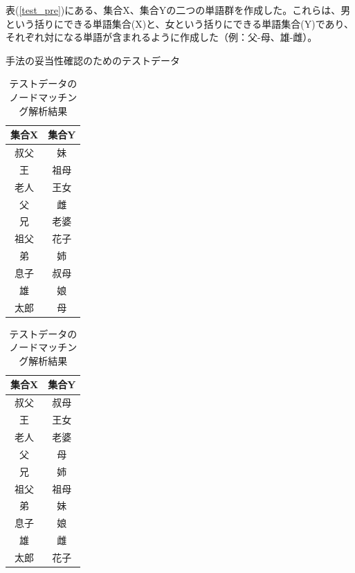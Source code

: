 表(\ref{test_pre})にある、集合X、集合Yの二つの単語群を作成した。これらは、男という括りにできる単語集合(X)と、女という括りにできる単語集合(Y)であり、それぞれ対になる単語が含まれるように作成した（例：父-母、雄-雌）。
\begin{table}[h]
  \begin{minipage}[t]{.45\textwidth}
    \caption[テストデータ]{手法の妥当性確認のためのテストデータ}
    \label{test_pre}
    \begin{center}
      \begin{tabular}{|c||c|} \hline
        集合X & 集合Y \\ \hline \hline
        叔父 & 妹 \\
        王 & 祖母 \\
        老人 & 王女 \\
        父 & 雌 \\
        兄 & 老婆 \\
        祖父 & 花子 \\
        弟 & 姉 \\
        息子 & 叔母 \\
        雄 & 娘 \\
        太郎 & 母 \\ \hline
      \end{tabular}
    \end{center}
  \end{minipage}
  \hfill
  \begin{minipage}[t]{.45\textwidth}
    \caption[テストデータのノードマッチング解析結果]{テストデータのノードマッチング解析結果}
    \label{test_bfr}
    \begin{center}
      \begin{tabular}{|c||c|} \hline
        集合X & 集合Y \\ \hline \hline
        叔父 & 叔母 \\
        王 & 王女 \\
        老人 & 老婆 \\
        父 & 母 \\
        兄 & 姉 \\
        祖父 & 祖母 \\
        弟 & 妹 \\
        息子 & 娘 \\
        雄 & 雌 \\
        太郎 & 花子 \\ \hline
      \end{tabular}
    \end{center}
  \end{minipage}
\end{table}

